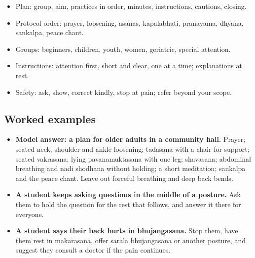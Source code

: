 
\begin{recall}
\begin{itemize}
\item Plan: group, aim, practices in order, minutes, instructions, cautions, closing.
\item Protocol order: prayer, loosening, asanas, kapalabhati, pranayama, dhyana, sankalpa, peace chant.
\item Groups: beginners, children, youth, women, geriatric, special attention.
\item Instructions: attention first, short and clear, one at a time; explanations at rest.
\item Safety: ask, show, correct kindly, stop at pain; refer beyond your scope.
\end{itemize}
\end{recall}

\subsection*{Worked examples}
\begin{itemize}
\item \textbf{Model answer: a plan for older adults in a community hall.} Prayer; seated neck, shoulder and ankle loosening; tadasana with a chair for support; seated vakrasana; lying pavanamuktasana with one leg; shavasana; abdominal breathing and nadi shodhana without holding; a short meditation; sankalpa and the peace chant. Leave out forceful breathing and deep back bends.
\item \textbf{A student keeps asking questions in the middle of a posture.} Ask them to hold the question for the rest that follows, and answer it there for everyone.
\item \textbf{A student says their back hurts in bhujangasana.} Stop them, have them rest in makarasana, offer sarala bhujangasana or another posture, and suggest they consult a doctor if the pain continues.
\end{itemize}

